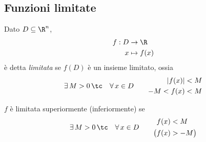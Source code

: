 \subsection{Funzioni limitate}

Dato $ D \subseteq \R^{n} $,\begin{align*}
f:D & \to \R \\
x & \mapsto f(x)
\end{align*} è detta \textit{limitata} se $ f(D) $ è un insieme limitato, ossia \[
    \exists\, M>0\,\tc\quad \forall\, x \in D\qquad \begin{aligned}
        |f(x)|&<M\\
        -M<f(x)&< M
    \end{aligned}
\]

$ f $ è limitata superiormente (inferiormente) se \[
    \exists\, M>0\,\tc\quad \forall\, x \in D\qquad\begin{aligned}
        f(x)&<M\\
        \bigl(f(x)&>-M\bigr)
    \end{aligned}
\]

